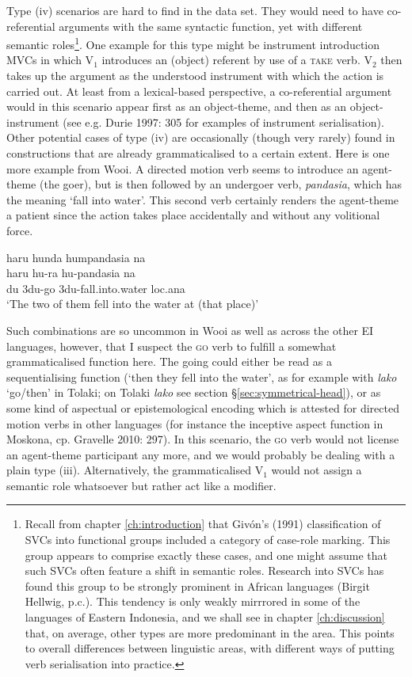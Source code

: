 Type (iv) scenarios are hard to find in the data set. They would need to have co-referential arguments with the same syntactic function, yet with different semantic roles\footnote{Recall from chapter \ref{ch:introduction} that Givón's (1991) classification of SVCs into functional groups included a category of case-role marking. This group appears to comprise exactly these cases, and one might assume that such SVCs often feature a shift in semantic roles. Research into SVCs has found this group to be strongly prominent in African languages (Birgit Hellwig, p.c.). This tendency is only weakly mirrrored in some of the languages of Eastern Indonesia, and we shall see in chapter \ref{ch:discussion} that, on average, other types are more predominant in the area. This points to overall differences between linguistic areas, with different ways of putting verb serialisation into practice.}. One example for this type might be instrument introduction MVCs in which V$_1$ introduces an (object) referent by use of a \textsc{take} verb. V$_2$ then takes up the argument as the understood instrument with which the action is carried out. At least from a lexical-based perspective, a co-referential argument would in this scenario appear first as an object-theme, and then as an object-instrument (see e.g. Durie 1997:  305 for examples of instrument serialisation). Other potential cases of type (iv) are occasionally (though very rarely) found in constructions that are already grammaticalised to a certain extent. Here is one more example from Wooi. A directed motion verb seems to introduce an agent-theme (the goer), but is then followed by an undergoer verb, \textit{pandasia}, which has the meaning `fall into water'. This second verb certainly renders the agent-theme a patient since the action takes place accidentally and without any volitional force.

\ea \label{}
\gll haru hunda humpandasia na \\
haru hu-ra hu-pandasia na \\
\acs{du} 3\acs{du}-go 3\acs{du}-fall.into.water \acs{loc}.\acs{ana} \\
\glft `The two of them fell into the water at (that place)' \\ 
\z
\xe

Such combinations are so uncommon in Wooi as well as across the other EI languages, however, that I suspect the \textsc{go} verb to fulfill a somewhat grammaticalised function here. The going could either be read as a sequentialising function (`then they fell into the water', as for example with \textit{lako} `go/then' in Tolaki; on Tolaki \textit{lako} see section §\ref{sec:symmetrical-head}), or as some kind of aspectual or epistemological encoding which is attested for directed motion verbs in other languages (for instance the inceptive aspect function in Moskona, cp. Gravelle 2010: 297). In this scenario, the \textsc{go} verb would not license an agent-theme participant any more, and we would probably be dealing with a plain type (iii). Alternatively, the grammaticalised V$_1$ would not assign a semantic role whatsoever but rather act like a modifier.

